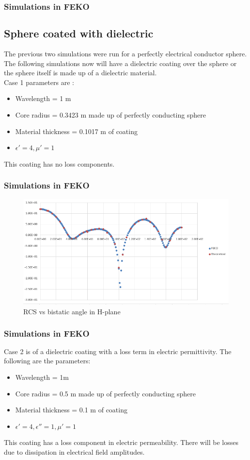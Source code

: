 \documentclass{beamer}
\begin{document}
\begin{frame}
\frametitle{Simulations in FEKO}
\subsection{Sphere coated with dielectric}
The previous two simulations were run for a perfectly electrical conductor sphere. The following simulations now will have a dielectric coating over the sphere  or the sphere itself is made up of a dielectric material.\\ 
Case 1 parameters are :
\begin{itemize}
\item Wavelength = 1 m
\item Core radius = 0.3423 m made up of perfectly conducting sphere
\item Material thickness = 0.1017 m of coating
\item $\epsilon'= 4, \mu' = 1$  
\end{itemize}
This coating has no loss components.
\end{frame}
\begin{frame}
\frametitle{Simulations in FEKO}
\begin{figure}[H]
\centering
\includegraphics[width = \textwidth]{case1.PNG}
\caption{RCS vs bistatic angle in H-plane}
\end{figure}
\end{frame}
\begin{frame}
\frametitle{Simulations in FEKO}
Case 2 is of a dielectric coating with a loss term in electric permittivity. The following are the parameters:
\begin{itemize}
\item Wavelength = 1m
\item Core radius = 0.5 m made up of perfectly conducting sphere
\item Material thickness = 0.1 m of coating
\item $\epsilon' = 4, \epsilon'' = 1, \mu' = 1$
\end{itemize}
This coating has a loss component in electric permeability. There will be losses due to dissipation in electrical field amplitudes. 
\end{frame}
\end{document}

